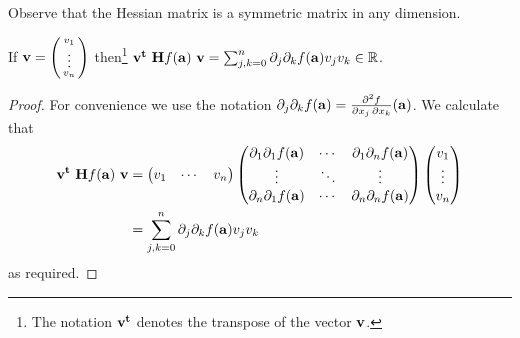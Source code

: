 Observe that the Hessian matrix is a symmetric matrix in any dimension.


\begin{lemma*}
    If \(\vv= \left( \begin{smallmatrix}
            v_1\\ \vdots \\v_n
        \end{smallmatrix} \right)  \) then\footnote{The notation \(\vv^{\mathbf{t}}\) denotes the transpose of the vector \(\vv\).} \(\vv^{\mathbf{t}} \ \mathbf{H} f (\aa) \ \vv = \sum_{j,k=0}^{n}
    \partial_{j}\partial_{k}f(\aa)
    v_j v_k \in \bR\).
\end{lemma*}

\begin{proof}
    For convenience we use the notation
    \(\partial_{j}\partial_{k}f(\aa) = \frac{\partial^2 f}{\partial x_j\,\partial x_k} (\aa)\).
    We calculate that
    \[
        \begin{aligned}
            \vv^{\mathbf{t}} \ \mathbf{H} f (\aa) \ \vv
             & =
            \begin{pmatrix}
                v_1 & \cdots & v_n
            \end{pmatrix}
            \begin{pmatrix}
                \partial_{1}\partial_{1}f(\aa) & \cdots &
                \partial_{1}\partial_{n}f(\aa)                   \\
                \vdots                         & \ddots & \vdots \\
                \partial_{n}\partial_{1}f(\aa) & \cdots &
                \partial_{n}\partial_{n}f(\aa)
            \end{pmatrix}
            \begin{pmatrix}
                v_1 \\ \vdots \\v_n
            \end{pmatrix} \\
             & = \sum_{j,k=0}^{n}
            \partial_{j}\partial_{k}f(\aa)
            v_j v_k
        \end{aligned}
    \]
    as required.
\end{proof}


